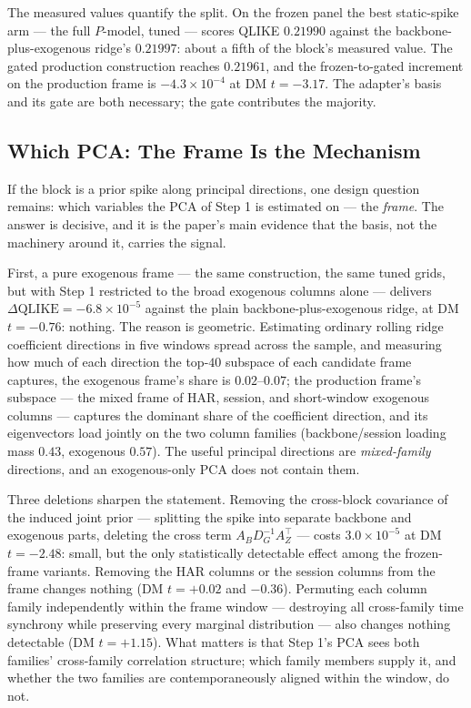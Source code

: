 The measured values quantify the split. On the frozen panel the best
static-spike arm --- the full $P$-model, tuned --- scores QLIKE
$0.21990$ against the backbone-plus-exogenous ridge's $0.21997$: about a
fifth of the block's measured value. The gated production construction
reaches $0.21961$, and the frozen-to-gated increment on the production
frame is $-4.3 \times 10^{-4}$ at DM $t = -3.17$. The adapter's basis
and its gate are both necessary; the gate contributes the majority.

\subsection{Which PCA: The Frame Is the Mechanism}
\label{sec:pca_which_frame}

If the block is a prior spike along principal directions, one design
question remains: which variables the PCA of Step 1 is estimated on ---
the \emph{frame}. The answer is decisive, and it is the paper's main
evidence that the basis, not the machinery around it, carries the
signal.

First, a pure exogenous frame --- the same construction, the same tuned
grids, but with Step 1 restricted to the broad exogenous columns alone
--- delivers $\Delta\mathrm{QLIKE} = -6.8 \times 10^{-5}$ against the
plain backbone-plus-exogenous ridge, at DM $t = -0.76$: nothing. The
reason is geometric. Estimating ordinary rolling ridge coefficient
directions in five windows spread across the sample, and measuring how
much of each direction the top-$40$ subspace of each candidate frame
captures, the exogenous frame's share is $0.02$--$0.07$; the production
frame's subspace --- the mixed frame of HAR, session, and short-window
exogenous columns --- captures the dominant share of the coefficient
direction, and its eigenvectors load jointly on the two column families
(backbone/session loading mass $0.43$, exogenous $0.57$). The useful
principal directions are \emph{mixed-family} directions, and an
exogenous-only PCA does not contain them.

Three deletions sharpen the statement. Removing the cross-block
covariance of the induced joint prior --- splitting the spike into
separate backbone and exogenous parts, deleting the cross term
$A_B D_G^{-1} A_Z^{\top}$ --- costs $3.0 \times 10^{-5}$ at DM
$t = -2.48$: small, but the only statistically detectable effect among
the frozen-frame variants. Removing the HAR columns or the session
columns from the frame changes nothing (DM $t = +0.02$ and $-0.36$).
Permuting each column family independently within the frame window ---
destroying all cross-family time synchrony while preserving every
marginal distribution --- also changes nothing detectable (DM
$t = +1.15$). What matters is that Step 1's PCA sees both families'
cross-family correlation structure; which family members supply it, and
whether the two families are contemporaneously aligned within the
window, do not.

